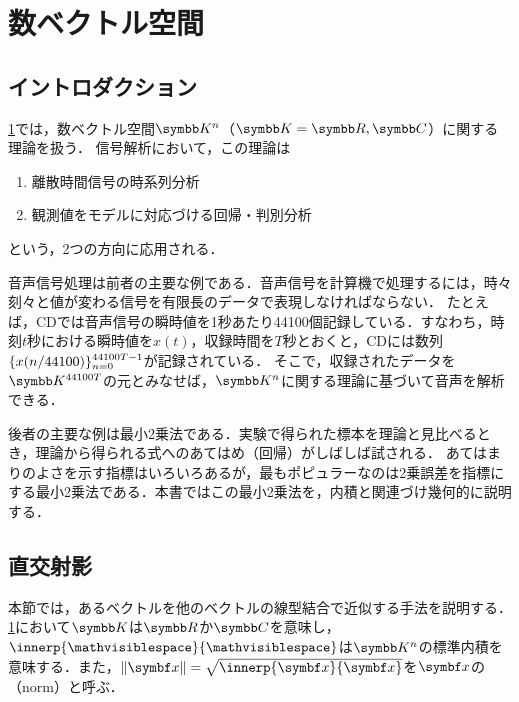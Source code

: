 \documentclass[../../main]{subfiles}
\begin{document}
\chapter{数ベクトル空間}
\label{chapter:numerical_vector_space}

\section{イントロダクション}
\label{section:numerical_vector_space_introduction}

\cref{chapter:numerical_vector_space}では，数ベクトル空間\(\numset{K}^n\)（\(\numset{K}=\numset{R},\numset{C}\)）に関する理論を扱う．
信号解析において，この理論は
\begin{enumerate}
  \item 離散時間信号の時系列分析
  \item 観測値をモデルに対応づける回帰・判別分析
\end{enumerate}
という，2つの方向に応用される．

音声信号処理は前者の主要な例である．音声信号を計算機で処理するには，時々刻々と値が変わる信号を有限長のデータで表現しなければならない．
たとえば，CDでは音声信号の瞬時値を1秒あたり44100個記録している．すなわち，時刻\(t\)秒における瞬時値を\(x(t)\)，収録時間を\(T\)秒とおくと，CDには数列\(\lbrace x(n/44100)\rbrace_{n=0}^{44100T-1}\)が記録されている．
そこで，収録されたデータを\(\numset{K}^{44100T}\)の元とみなせば，\(\numset{K}^n\)に関する理論に基づいて音声を解析できる．

後者の主要な例は最小2乗法である．実験で得られた標本を理論と見比べるとき，理論から得られる式へのあてはめ（回帰）がしばしば試される．
あてはまりのよさを示す指標はいろいろあるが，最もポピュラーなのは2乗誤差を指標にする最小2乗法である．本書ではこの最小2乗法を，内積と関連づけ幾何的に説明する．

\pagebreak

\section{直交射影}

本節では，あるベクトルを他のベクトルの線型結合で近似する手法を説明する．\cref{chapter:numerical_vector_space}において\(\numset{K}\)は\(\numset{R}\)か\(\numset{C}\)を意味し，
\(\innerp{\holder}{\holder}\)は\(\numset{K}^n\)の標準内積を意味する．また，\(\vnorm{\vect{x}}=\sqrt{\innerp{\vect{x}}{\vect{x}}}\)を\(\vect{x}\)の\indexsymbol{\(\vnorm{\holder}\)}（norm）と呼ぶ．
\end{document}
